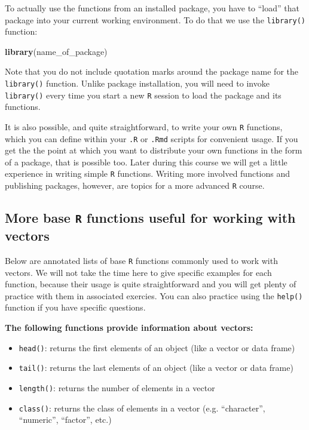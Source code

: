\documentclass[]{book}
\newenvironment{Shaded}{\begin{snugshade}}{\end{snugshade}}
\newcommand{\KeywordTok}[1]{\textcolor[rgb]{0.13,0.29,0.53}{\textbf{#1}}}
\newcommand{\NormalTok}[1]{#1}
\begin{document}
To actually use the functions from an installed package, you have to ``load'' that package into your current working environment. To do that we use the \texttt{library()} function:

\begin{Shaded}
\begin{Highlighting}[]
\KeywordTok{library}\NormalTok{(name_of_package)}
\end{Highlighting}
\end{Shaded}

Note that you do not include quotation marks around the package name for the \texttt{library()} function. Unlike package installation, you will need to invoke \texttt{library()} every time you start a new \texttt{R} session to load the package and its functions.

It is also possible, and quite straightforward, to write your own \texttt{R} functions, which you can define within your \texttt{.R} or \texttt{.Rmd} scripts for convenient usage. If you get the the point at which you want to distribute your own functions in the form of a package, that is possible too. Later during this course we will get a little experience in writing simple \texttt{R} functions. Writing more involved functions and publishing packages, however, are topics for a more advanced \texttt{R} course.

\hypertarget{more-base-r-functions-useful-for-working-with-vectors}{%
\subsection{\texorpdfstring{More base \texttt{R} functions useful for working with vectors}{More base R functions useful for working with vectors}}\label{more-base-r-functions-useful-for-working-with-vectors}}

Below are annotated lists of base \texttt{R} functions commonly used to work with vectors. We will not take the time here to give specific examples for each function, because their usage is quite straightforward and you will get plenty of practice with them in associated exercies. You can also practice using the \texttt{help()} function if you have specific questions.

\textbf{The following functions provide information about vectors:}

\begin{itemize}
\item
  \texttt{head()}: returns the first elements of an object (like a vector or data frame)
\item
  \texttt{tail()}: returns the last elements of an object (like a vector or data frame)
\item
  \texttt{length()}: returns the number of elements in a vector
\item
  \texttt{class()}: returns the class of elements in a vector (e.g. ``character'', ``numeric'', ``factor'', etc.)
\end{itemize}
\end{document}
